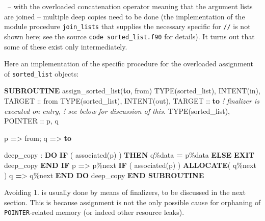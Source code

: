 \documentclass[
]{article}
\newenvironment{Shaded}{}{}
\newcommand{\CommentTok}[1]{\textcolor[rgb]{0.38,0.63,0.69}{\textit{#1}}}
\newcommand{\DataTypeTok}[1]{\textcolor[rgb]{0.56,0.13,0.00}{#1}}
\newcommand{\FunctionTok}[1]{\textcolor[rgb]{0.02,0.16,0.49}{#1}}
\newcommand{\KeywordTok}[1]{\textcolor[rgb]{0.00,0.44,0.13}{\textbf{#1}}}
\newcommand{\NormalTok}[1]{#1}
\newcommand{\OperatorTok}[1]{\textcolor[rgb]{0.40,0.40,0.40}{#1}}
\begin{document}
~-- with the overloaded concatenation operator meaning that the argument
lists are joined -- multiple deep copies need to be done (the
implementation of the module procedure \texttt{join\_lists} that
supplies the necessary specific for \texttt{//} is not shown here; see
the source \texttt{code\ sorted\_list.f90} for details). It turns out
that some of these exist only intermediately.

Here an implementation of the specific procedure for the overloaded
assignment of \texttt{sorted\_list} objects:

\begin{Shaded}
\begin{Highlighting}[]
\KeywordTok{SUBROUTINE}\NormalTok{ assign\_sorted\_list(}\KeywordTok{to}\NormalTok{, from)}
   \DataTypeTok{TYPE(sorted\_list)}\NormalTok{, }\DataTypeTok{INTENT(in)}\NormalTok{, }\DataTypeTok{TARGET} \DataTypeTok{::}\NormalTok{ from}
   \DataTypeTok{TYPE(sorted\_list)}\NormalTok{, }\DataTypeTok{INTENT(out)}\NormalTok{, }\DataTypeTok{TARGET} \DataTypeTok{::} \KeywordTok{to}  \CommentTok{! finalizer is executed on entry,}
                                                 \CommentTok{! see below for discussion of this.}
   \DataTypeTok{TYPE(sorted\_list)}\NormalTok{, }\DataTypeTok{POINTER} \DataTypeTok{::}\NormalTok{ p, q}

\NormalTok{   p }\KeywordTok{=}\OperatorTok{\textgreater{}}\NormalTok{ from; q }\KeywordTok{=}\OperatorTok{\textgreater{}} \KeywordTok{to}

\NormalTok{   deep\_copy : }\KeywordTok{DO}
      \KeywordTok{IF}\NormalTok{ ( }\FunctionTok{associated}\NormalTok{(p) ) }\KeywordTok{THEN}
\NormalTok{         q}\OperatorTok{\%}\NormalTok{data }\KeywordTok{=}\NormalTok{ p}\OperatorTok{\%}\NormalTok{data}
      \KeywordTok{ELSE}
         \KeywordTok{EXIT}\NormalTok{ deep\_copy}
      \KeywordTok{END IF}
\NormalTok{      p }\KeywordTok{=}\OperatorTok{\textgreater{}}\NormalTok{ p}\OperatorTok{\%}\NormalTok{next}
      \KeywordTok{IF}\NormalTok{ ( }\FunctionTok{associated}\NormalTok{(p) ) }\KeywordTok{ALLOCATE}\NormalTok{( q}\OperatorTok{\%}\NormalTok{next )}
\NormalTok{      q }\KeywordTok{=}\OperatorTok{\textgreater{}}\NormalTok{ q}\OperatorTok{\%}\NormalTok{next}
   \KeywordTok{END DO}\NormalTok{ deep\_copy}
\KeywordTok{END SUBROUTINE}
\end{Highlighting}
\end{Shaded}

Avoiding 1. is usually done by means of finalizers, to be discussed in
the next section. This is because assignment is not the only possible
cause for orphaning of \texttt{POINTER}-related memory (or indeed other
resource leaks).
\end{document}
